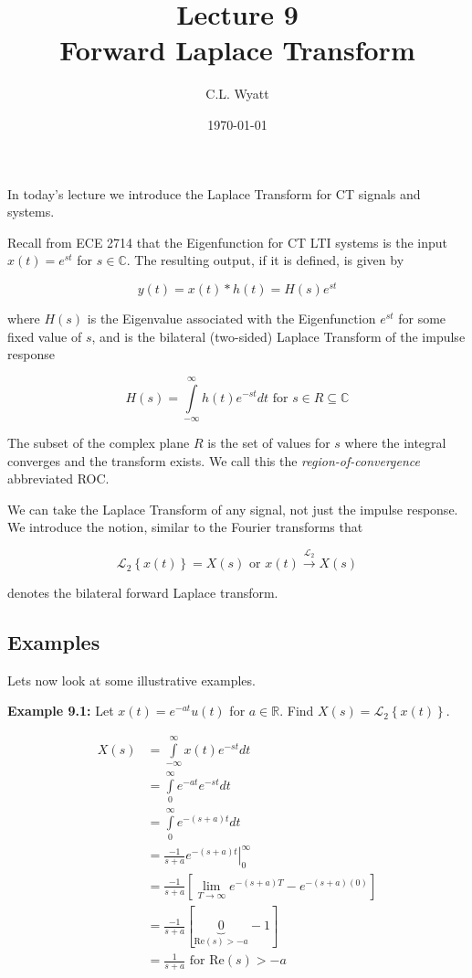 \documentclass{article}
\begin{document}
\title{Lecture 9\\ Forward Laplace Transform}
\author{C.L. Wyatt}
\date{\today}
\maketitle

In today's lecture we introduce the Laplace Transform for CT signals and systems.

Recall from ECE 2714 that the Eigenfunction for CT LTI systems is the input $x(t) = e^{st}$ for $s\in\mathbb{C}$. The resulting output, if it is defined, is given by

\[
y(t) = x(t)*h(t) = H(s) e^{st}
\]

where $H(s)$ is the Eigenvalue associated with the Eigenfunction $e^{st}$ for some fixed value of $s$, and is the bilateral (two-sided) Laplace Transform of the impulse response

\[
H(s) = \int\limits_{-\infty}^{\infty} h(t) e^{-st} dt \text{ for } s\in R \subseteq  \mathbb{C}
\]

The subset of the complex plane $R$ is the set of values for $s$ where the integral converges and the transform exists. We call this the \textit{region-of-convergence} abbreviated ROC.

We can take the Laplace Transform of any signal, not just the impulse response. We introduce the notion, similar to the Fourier transforms that

\[
\mathcal{L}_2\left\{ x(t) \right\} = X(s) \text{ or } x(t) \stackrel{\mathcal{L}_2}{\longrightarrow} X(s)
\]

denotes the bilateral forward Laplace transform.

\subsection{Examples}

Lets now look at some illustrative examples.

\textbf{Example 9.1:} Let $x(t) = e^{-at} u(t)$ for $a\in\mathbb{R}$. Find $X(s) = \mathcal{L}_2\left\{ x(t) \right\}$.

\begin{align}
  X(s) &= \int\limits_{-\infty}^{\infty} x(t) e^{-st} dt\\
  &= \int\limits_{0}^{\infty} e^{-at} e^{-st} dt\\
  &= \int\limits_{0}^{\infty} e^{-(s+a)t} dt\\
  &= \left. \frac{-1}{s+a} e^{-(s+a)t} \right|_{0}^{\infty}\\
  &= \frac{-1}{s+a} \left[\lim_{T\rightarrow \infty} e^{-(s+a)T} - e^{-(s+a)(0)} \right]\\
  &= \frac{-1}{s+a} \left[\underbrace{0}_{\text{Re}(s) > -a} - 1\right]\\
  &= \frac{1}{s+a} \text{ for Re}(s) > -a
\end{align}
\end{document}
